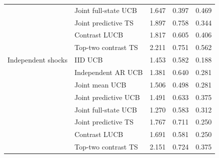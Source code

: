 \begin{tabular}{llrrr}
 & Joint full-state UCB & 1.647 & 0.397 & 0.469\\
 & Joint predictive TS & 1.897 & 0.758 & 0.344\\
 & Contrast LUCB & 1.817 & 0.605 & 0.406\\
 & Top-two contrast TS & 2.211 & 0.751 & 0.562\\
\midrule
Independent shocks & IID UCB & 1.453 & 0.582 & 0.188\\
 & Independent AR UCB & 1.381 & 0.640 & 0.281\\
 & Joint mean UCB & 1.506 & 0.498 & 0.281\\
 & Joint predictive UCB & 1.491 & 0.633 & 0.375\\
 & Joint full-state UCB & 1.270 & 0.583 & 0.312\\
 & Joint predictive TS & 1.767 & 0.711 & 0.250\\
 & Contrast LUCB & 1.691 & 0.581 & 0.250\\
 & Top-two contrast TS & 2.151 & 0.724 & 0.375\\
\bottomrule
\end{tabular}
